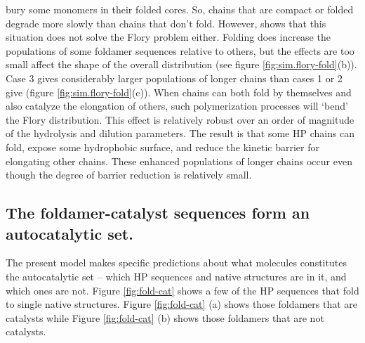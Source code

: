 \documentclass[5p,times]{elsarticle}
\begin{document}
bury some monomers in their folded cores.  So, chains that are compact or folded degrade more 
slowly than chains that don't fold.  However, 
shows that this situation does not solve the Flory problem either.  Folding does increase the 
populations of some foldamer sequences relative to others, but the effects are too small affect the 
shape of the overall distribution (see figure \ref{fig:sim.flory-fold}(b)).  
Case 3 gives considerably larger populations of longer chains than cases 1 or 2 give (figure 
\ref{fig:sim.flory-fold}(c)).  When chains 
can both fold by themselves and also catalyze the elongation of others, such polymerization 
processes will `bend' the Flory distribution.  This effect is relatively robust over an order of 
magnitude of the hydrolysis and dilution parameters.  The result is that some HP chains can fold, 
expose some hydrophobic surface, and reduce the kinetic barrier for elongating other chains.  These 
enhanced populations of longer chains occur even though the degree of barrier reduction is 
relatively small.



\subsection{The foldamer-catalyst sequences form an autocatalytic set.}

 The present model makes specific predictions about what molecules constitutes the autocatalytic 
set -- which HP sequences and native structures are in it, and which ones are not.  Figure 
\ref{fig:fold-cat} shows a few of the HP sequences that fold to single native structures.  Figure 
\ref{fig:fold-cat} (a) shows those foldamers that are catalysts while Figure \ref{fig:fold-cat} (b) 
shows those foldamers that are not catalysts.  
 
\end{document}
